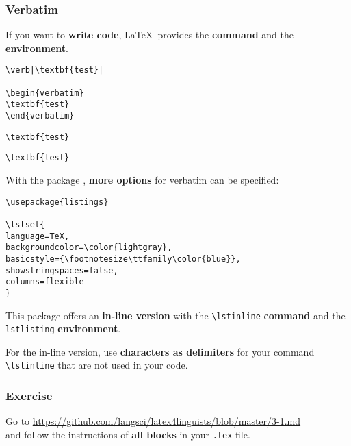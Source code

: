 \begin{frame}[fragile]
\frametitle{Verbatim}

If you want to \textbf{write code}, \LaTeX\ provides the \textbf{ command} and the \textbf{ environment}.

\begin{multicols}{2}
	
\begin{lstlisting}
\verb|\textbf{test}|

\begin{verbatim}
\textbf{test}
\end{verbatim}

\end{lstlisting}	

\columnbreak

\verb|\textbf{test}|

\begin{verbatim}
\textbf{test}
\end{verbatim}

\end{multicols}

\end{frame}


\begin{frame}[fragile]

With the package , \textbf{more options} for verbatim can be specified:

\begin{lstlisting}
\usepackage{listings}

\lstset{
language=TeX,
backgroundcolor=\color{lightgray},
basicstyle={\footnotesize\ttfamily\color{blue}},
showstringspaces=false,
columns=flexible
}
\end{lstlisting}

\bigskip

This package offers an \textbf{in-line version} with the \lstinline|\lstinline| \textbf{command} 
and the \lstinline|lstlisting| \textbf{environment}.

\bigskip

For the in-line version, use \textbf{characters as delimiters} for your command \lstinline|\lstinline| that are not used in your code.

\end{frame}


\begin{frame}[fragile]
\frametitle{Exercise}


Go to \url{https://github.com/langsci/latex4linguists/blob/master/3-1.md}\\
and follow the instructions of \textbf{all blocks} in your \texttt{.tex} file.


\end{frame}


